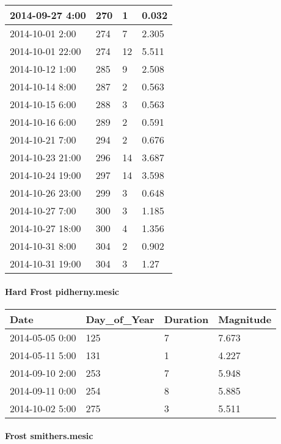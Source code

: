\documentclass[
]{article}
\begin{document}
\begin{tabular}{l|l|l|l}
\hline
2014-09-27 4:00 & 270 & 1 & 0.032\\
\hline
2014-10-01 2:00 & 274 & 7 & 2.305\\
\hline
2014-10-01 22:00 & 274 & 12 & 5.511\\
\hline
2014-10-12 1:00 & 285 & 9 & 2.508\\
\hline
2014-10-14 8:00 & 287 & 2 & 0.563\\
\hline
2014-10-15 6:00 & 288 & 3 & 0.563\\
\hline
2014-10-16 6:00 & 289 & 2 & 0.591\\
\hline
2014-10-21 7:00 & 294 & 2 & 0.676\\
\hline
2014-10-23 21:00 & 296 & 14 & 3.687\\
\hline
2014-10-24 19:00 & 297 & 14 & 3.598\\
\hline
2014-10-26 23:00 & 299 & 3 & 0.648\\
\hline
2014-10-27 7:00 & 300 & 3 & 1.185\\
\hline
2014-10-27 18:00 & 300 & 4 & 1.356\\
\hline
2014-10-31 8:00 & 304 & 2 & 0.902\\
\hline
2014-10-31 19:00 & 304 & 3 & 1.27\\
\hline
\end{tabular}

\hypertarget{hard-frost-pidherny.mesic}{%
\paragraph{Hard Frost pidherny.mesic}\label{hard-frost-pidherny.mesic}}

\begin{tabular}{l|l|l|l}
\hline
Date & Day\_of\_Year & Duration & Magnitude\\
\hline
2014-05-05 0:00 & 125 & 7 & 7.673\\
\hline
2014-05-11 5:00 & 131 & 1 & 4.227\\
\hline
2014-09-10 2:00 & 253 & 7 & 5.948\\
\hline
2014-09-11 0:00 & 254 & 8 & 5.885\\
\hline
2014-10-02 5:00 & 275 & 3 & 5.511\\
\hline
\end{tabular}

\hypertarget{frost-smithers.mesic}{%
\paragraph{Frost smithers.mesic}\label{frost-smithers.mesic}}
\end{document}
